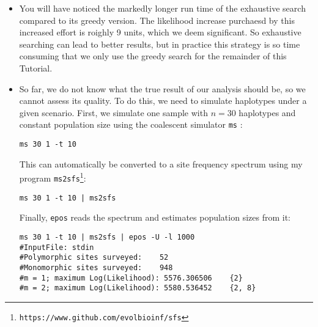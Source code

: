 \documentclass[a4paper, english]{article}
\newcommand{\ty}{\texttt}
\begin{document}
\begin{itemize}
\begin{verbatim}
#Final Log(Likelihood):          150958643.053014
#d^2:                              0.00185004
#Level	T[Level]	N[Level]
13	4.51e+03	2.26e+04
12	8.35e+03	1.27e+05
5	8.80e+03	7.01e+02
2	3.62e+04	9.15e+03
\end{verbatim}
The option \ty{-E 30} indicates that up to 30 levels, that is all
possible levels in the coalescent, can be added by exhaustive
search. The first two rounds are always the same as under the greedy
regime. However, at $m=3$ level 11 from the previous round is dropped
and levels 4 and 9 are added. The increase is roughly 6.7 units,
which is more than the 2 units required for the acceptance of a new
level, the search continues to $m=4$. Here levels 4 and 9 from the
previous round are replaced by levels 5, 12, and 13 leading to a
likelihood increase by 2.3 a fifth and final round of, $m=5$. Here
levels 5, 12, and 13 are replaced by 6, 14, 15, and 24, but the
likelihood increase is less than one and, the search is stopped, and
we get the result for $m=4$.
\item You will have noticed the markedly longer run time of the
  exhaustive search compared to its greedy version. The likelihood
  increase purchaesd by this increased effort is roighly 9 units,
  which we deem significant. So exhaustive searching can lead to
  better results, but in practice this strategy is so time consuming
  that we only use the greedy search for the remainder of this
  Tutorial. 
\item So far, we do not know what the true result of our analysis
  should be, so we cannot assess its quality. To do this, we need to
  simulate haplotypes under a given scenario. First, we simulate one
  sample with $n=30$ haplotypes and constant population size using the
  coalescent simulator \ty{ms} \citep{hud02:gen}:
\begin{verbatim}
ms 30 1 -t 10 
\end{verbatim}
This can automatically be converted to a site frequency spectrum using
my program \ty{ms2sfs}\footnote{\ty{https://www.github.com/evolbioinf/sfs}}:
\begin{verbatim}
ms 30 1 -t 10 | ms2sfs
\end{verbatim}
Finally, \ty{epos} reads the spectrum and estimates population
sizes from it:
\begin{verbatim}
ms 30 1 -t 10 | ms2sfs | epos -U -l 1000
#InputFile:	stdin
#Polymorphic sites surveyed:	52
#Monomorphic sites surveyed:	948
#m = 1; maximum Log(Likelihood): 5576.306506	{2}
#m = 2; maximum Log(Likelihood): 5580.536452	{2, 8}

\end{verbatim}
\end{itemize}
\end{document}
